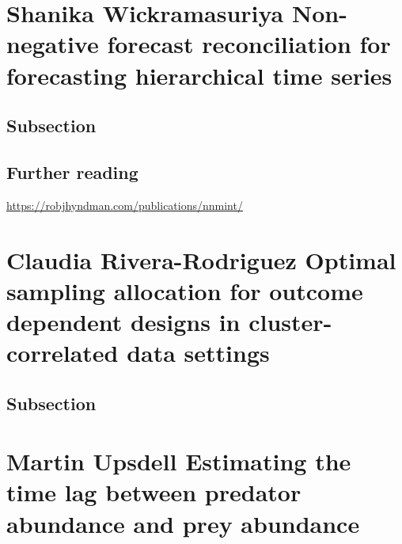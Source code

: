 \documentclass[
]{book}
\begin{document}
\hypertarget{shanika-wickramasuriya-non-negative-forecast-reconciliation-for-forecasting-hierarchical-time-series}{%
\chapter*{Shanika Wickramasuriya \textbar{} Non-negative forecast reconciliation for forecasting hierarchical time series}\label{shanika-wickramasuriya-non-negative-forecast-reconciliation-for-forecasting-hierarchical-time-series}}

\hypertarget{subsection}{%
\section{Subsection}\label{subsection}}

\hypertarget{further-reading}{%
\section{Further reading}\label{further-reading}}

\url{https://robjhyndman.com/publications/nnmint/}

\hypertarget{claudia-rivera-rodriguez-optimal-sampling-allocation-for-outcome-dependent-designs-in-cluster-correlated-data-settings}{%
\chapter*{Claudia Rivera-Rodriguez \textbar{} Optimal sampling allocation for outcome dependent designs in cluster-correlated data settings}\label{claudia-rivera-rodriguez-optimal-sampling-allocation-for-outcome-dependent-designs-in-cluster-correlated-data-settings}}

\hypertarget{subsection}{%
\section{Subsection}\label{subsection}}

\hypertarget{martin-upsdell-estimating-the-time-lag-between-predator-abundance-and-prey-abundance}{%
\chapter*{Martin Upsdell \textbar{} Estimating the time lag between predator abundance and prey abundance}\label{martin-upsdell-estimating-the-time-lag-between-predator-abundance-and-prey-abundance}}
\end{document}
